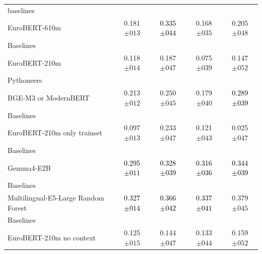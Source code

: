 \begin{tabularx}{\textwidth}{X | c c c c}
baselines\\\subcatarrow{}EuroBERT-610m & \textcolor{White!50!NavyBlue}{0.181$\pm{}013$} & \textcolor{Black}{0.335$\pm{}044$} & \textcolor{White!50!NavyBlue}{0.168$\pm{}035$} & \textcolor{White!50!NavyBlue}{0.205$\pm{}048$} \\
Baselines\\\subcatarrow{}EuroBERT-210m & \textcolor{NavyBlue}{0.118$\pm{}014$} & \textcolor{NavyBlue}{0.187$\pm{}047$} & \textcolor{NavyBlue}{0.075$\pm{}039$} & \textcolor{White!50!NavyBlue}{0.147$\pm{}052$} \\
Pythoneers\\\subcatarrow{}BGE-M3 or ModernBERT & \textcolor{White!50!NavyBlue}{0.213$\pm{}012$} & \textcolor{White!50!NavyBlue}{0.250$\pm{}045$} & \textcolor{White!50!NavyBlue}{0.179$\pm{}040$} & \textcolor{Black}{0.289$\pm{}039$} \\
Baselines\\\subcatarrow{}EuroBERT-210m only trainset & \textcolor{NavyBlue}{0.097$\pm{}013$} & \textcolor{White!50!NavyBlue}{0.233$\pm{}047$} & \textcolor{NavyBlue}{0.121$\pm{}043$} & \textcolor{NavyBlue}{0.025$\pm{}047$} \\
Baselines\\\subcatarrow{}Gemma4-E2B & \textcolor{Black}{0.295$\pm{}011$} & \textcolor{Black}{0.328$\pm{}039$} & \textcolor{Black}{0.316$\pm{}036$} & \textcolor{Black}{0.344$\pm{}039$} \\
Baselines\\\subcatarrow{}Multilingual-E5-Large Random Forest & \textcolor{Black}{0.327$\pm{}014$} & \textcolor{Black}{0.366$\pm{}042$} & \textcolor{Black}{0.337$\pm{}041$} & \textcolor{White!50!BrickRed}{0.379$\pm{}045$} \\
Baselines\\\subcatarrow{}EuroBERT-210m no context & \textcolor{NavyBlue}{0.125$\pm{}015$} & \textcolor{NavyBlue}{0.144$\pm{}047$} & \textcolor{NavyBlue}{0.133$\pm{}044$} & \textcolor{White!50!NavyBlue}{0.159$\pm{}052$} \\
\hline
\end{tabularx}
